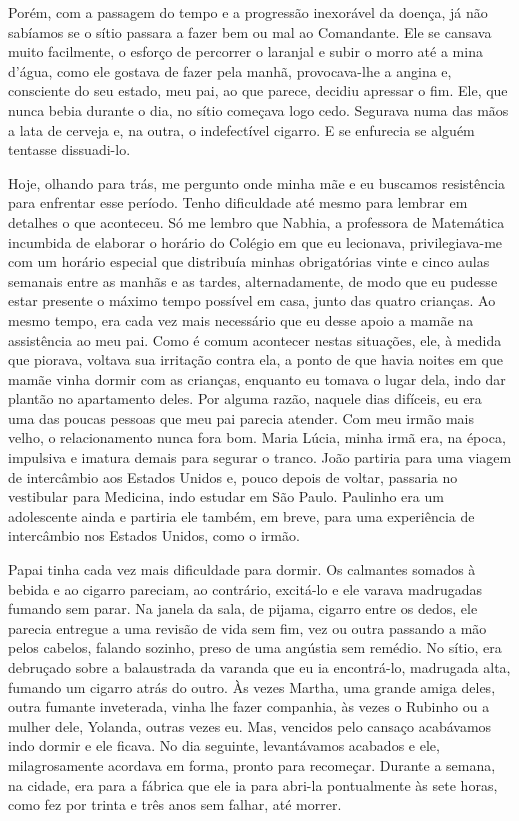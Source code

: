 Porém, com a passagem do tempo e a progressão inexorável da doença, já não sabíamos se o sítio passara a fazer bem ou mal ao Comandante.
Ele se cansava muito facilmente, o esforço de percorrer o laranjal e subir o morro até a mina d’água, como ele gostava de fazer pela manhã, provocava-lhe a angina e, consciente do seu estado, meu pai, ao que parece, decidiu apressar o fim.
Ele, que nunca bebia durante o dia, no sítio começava logo cedo.
Segurava numa das mãos a lata de cerveja e, na outra, o indefectível cigarro.
E se enfurecia se alguém tentasse dissuadi-lo.


Hoje, olhando para trás, me pergunto onde minha mãe e eu buscamos resistência para enfrentar esse período.
Tenho dificuldade até mesmo para lembrar em detalhes o que aconteceu.
Só me lembro que Nabhia, a professora de Matemática incumbida de elaborar o horário do Colégio em que eu lecionava, privilegiava-me com um horário especial que distribuía minhas obrigatórias vinte e cinco aulas semanais entre as manhãs e as tardes, alternadamente, de modo que eu pudesse estar presente o máximo tempo possível em casa, junto das quatro crianças.
Ao mesmo tempo, era cada vez mais necessário que eu desse apoio a mamãe na assistência ao meu pai.
Como é comum acontecer nestas situações, ele, à medida que piorava, voltava sua irritação contra ela, a ponto de que havia noites em que mamãe vinha dormir com as crianças, enquanto eu tomava o lugar dela, indo dar plantão no apartamento deles.
Por alguma razão, naquele dias difíceis, eu era uma das poucas pessoas que meu pai parecia atender.
Com meu irmão mais velho, o relacionamento nunca fora bom.
Maria Lúcia, minha irmã era, na época, impulsiva e imatura demais para segurar o tranco.
João partiria para uma viagem de intercâmbio aos Estados Unidos e, pouco depois de voltar, passaria no vestibular para Medicina, indo estudar em São Paulo.
Paulinho era um adolescente ainda e partiria ele também, em breve, para uma experiência de intercâmbio nos Estados Unidos, como o irmão.

Papai tinha cada vez mais dificuldade para dormir.
Os calmantes somados à bebida e ao cigarro pareciam, ao contrário, excitá-lo e ele varava madrugadas fumando sem parar.
Na janela da sala, de pijama, cigarro entre os dedos, ele parecia entregue a uma revisão de vida sem fim, vez ou outra passando a mão pelos cabelos, falando sozinho, preso de uma angústia sem remédio.
No sítio, era debruçado sobre a balaustrada da varanda que eu ia encontrá-lo, madrugada alta, fumando um cigarro atrás do outro.
Às vezes Martha, uma grande amiga deles, outra fumante inveterada, vinha lhe fazer companhia, às vezes o Rubinho ou a mulher dele, Yolanda, outras vezes eu.
Mas, vencidos pelo cansaço acabávamos indo dormir e ele ficava.
No dia seguinte, levantávamos acabados e ele, milagrosamente acordava em forma, pronto para recomeçar.
Durante a semana, na cidade, era para a fábrica que ele ia para abri-la pontualmente às sete horas, como fez por trinta e três anos sem falhar, até morrer.


